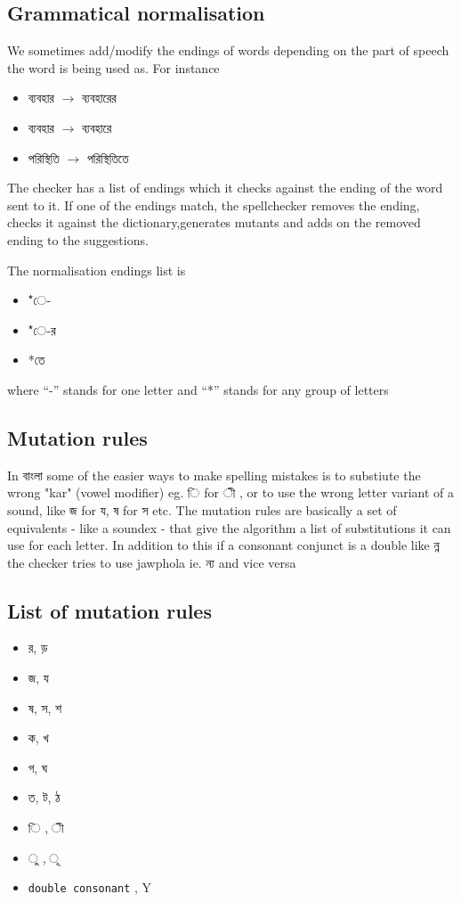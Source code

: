 \documentclass[11pt]{article}
\begin{document}
\subsection{Grammatical normalisation}
We sometimes add/modify the endings of words depending on the part of speech the word is being used as. For instance \begin{itemize}
\item {\lbng ব্যবহার} $\rightarrow$ {\lbng ব্যবহারের}
\item {\lbng ব্যবহার} $\rightarrow$ {\lbng ব্যবহারে}
\item {\lbng পরিস্থিতি} $\rightarrow$ {\lbng পরিস্থিতিতে}
\end{itemize}
The checker has a list of endings which it checks against the ending of the word sent to it. If one of the endings match, the spellchecker removes the ending, checks it against the dictionary,generates mutants and adds on the removed ending to the suggestions.

The normalisation endings list is
{\lbng
\begin{itemize}
\item *ে-
\item *ে-র
\item *তে
\end{itemize}
}
where ``-'' stands for one letter and ``*'' stands for any group of letters

\subsection{Mutation rules}
In {\bng বাংলা} some of the easier ways to make spelling mistakes is to substiute the wrong "kar" (vowel modifier) eg. {\bng ি} for {\bng ী} , or to use the wrong letter variant of a sound, like {\bng জ} for {\bng য},  {\bng ষ} for {\bng স} etc. 
The mutation rules are basically a set of equivalents - like a soundex - that give the algorithm a list of substitutions it can use for each letter.
In addition to this if a consonant conjunct is a double like {\bng ন্ন} the checker tries to use jawphola ie. {\bng ন্য} and vice versa

\subsection{List of mutation rules}
{\Lbng
\begin{itemize}
\item র, ড়
\item জ, য
\item ষ, স, শ
\item ক, খ
\item গ, ঘ
\item ত, ট, ঠ
\item ি , ী
\item  ু , ূ
\item {\tt double consonant} , Y
\end{itemize}
}
\end{document}
